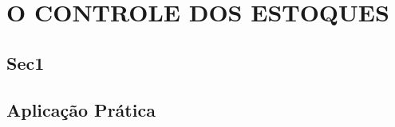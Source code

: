 \chapter{O CONTROLE DOS ESTOQUES}
\label{chap:controle_estoques}


\section{Sec1}
\label{sec:controle_estoques_sec1}




\section{Aplicação Prática}
\label{sec:controle_estoques_aplicacao}
